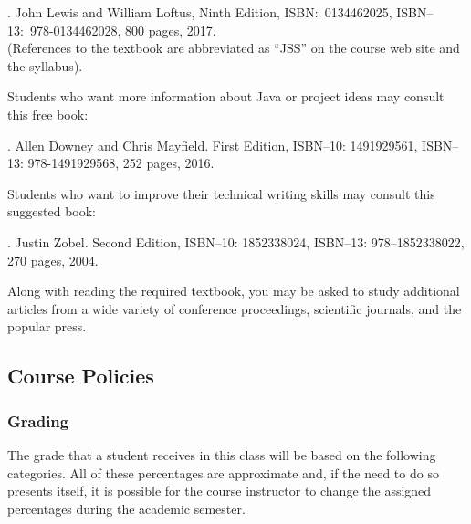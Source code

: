 \documentclass[11pt]{article}
\begin{document}
. John
Lewis and William Loftus, Ninth Edition, ISBN:\ 0134462025, ISBN--13:\
978-0134462028, 800 pages, 2017. \\ (References to the textbook are abbreviated
as ``JSS'' on the course web site and the syllabus).

\vspace*{.1in}

\noindent Students who want more information about Java or project ideas may
consult this free book:

. Allen Downey
and Chris Mayfield. First Edition, ISBN--10: 1491929561, ISBN--13:
978-1491929568, 252 pages, 2016.

\vspace*{.1in}

\noindent Students who want to improve their technical writing skills may
consult this suggested book:

. Justin Zobel. Second Edition,
ISBN--10: 1852338024, ISBN--13: 978--1852338022, 270 pages, 2004.

\vspace*{.1in}

\noindent Along with reading the required textbook, you may be asked to study
additional articles from a wide variety of conference proceedings, scientific
journals, and the popular press.

\vspace*{-.05in}

\subsection*{Course Policies}

\subsubsection*{Grading}

The grade that a student receives in this class will be based on the following categories. All of these percentages are
approximate and, if the need to do so presents itself, it is possible for the course instructor to change the assigned
percentages during the academic semester.
\end{document}
